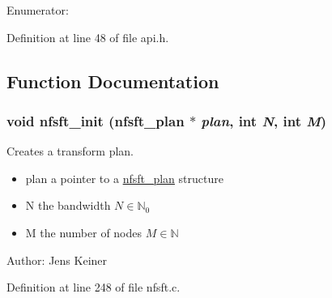 \begin{Desc}
\item[Enumerator: ]\par
\begin{description}
\item[{\em 
\hypertarget{group__nfsft_ggf6a258d8f3ee5206d682d799316314b1e9de385ef6fe9bf3360d1038396b884c}{
false}
\label{group__nfsft_ggf6a258d8f3ee5206d682d799316314b1e9de385ef6fe9bf3360d1038396b884c}
}]\item[{\em 
\hypertarget{group__nfsft_ggf6a258d8f3ee5206d682d799316314b108f175a5505a10b9ed657defeb050e4b}{
true}
\label{group__nfsft_ggf6a258d8f3ee5206d682d799316314b108f175a5505a10b9ed657defeb050e4b}
}]\end{description}
\end{Desc}



Definition at line 48 of file api.h.

\subsection{Function Documentation}
\hypertarget{group__nfsft_g65cda3f4a3edc5eb39c697cf34b1f0b9}{
\subsubsection{\setlength{\rightskip}{0pt plus 5cm}void nfsft\_\-init ({\bf nfsft\_\-plan} $\ast$ {\em plan}, int {\em N}, int {\em M})}}
\label{group__nfsft_g65cda3f4a3edc5eb39c697cf34b1f0b9}


Creates a transform plan. 

\begin{itemize}
\item plan a pointer to a \hyperlink{structnfsft__plan}{nfsft\_\-plan} structure \item N the bandwidth $N \in \mathbb{N}_0$ \item M the number of nodes $M \in \mathbb{N}$\end{itemize}
\begin{Desc}
\item[Author:]Jens Keiner \end{Desc}


Definition at line 248 of file nfsft.c.

